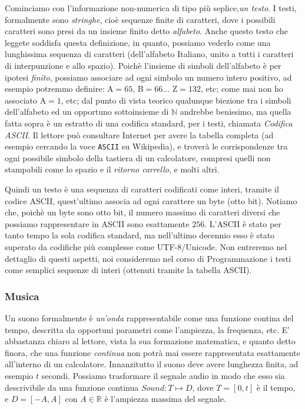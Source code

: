  Cominciamo con l'informazione non-numerica di tipo più seplice,\emph{un testo}. I testi, formalmente sono \emph{stringhe}, cioè sequenze finite di caratteri, dove i possibili caratteri sono presi da un insieme finito detto \emph{alfabeto}. Anche questo testo che leggete soddisfa questa definizione,
 in quanto, possiamo vederlo come una lunghissima sequenza di caratteri (dell'alfabeto Italiano, unito a tutti i caratteri di interpunzione e allo spazio). Poichè l'insieme di simboli dell'alfabeto è per ipotesi \emph{finito},
 possiamo associare ad ogni simbolo un numero intero positivo, ad esempio potremmo definire: \textsf{A}$=65$, \textsf{B}$=66 \ldots$ \textsf{Z}$=132$, etc; come mai non ho associato \textsf{A}$=1$, etc; dal punto di vista teorico
qualunque biezione tra i simboli dell'alfabeto ed un opportuno sottoinsieme di $\mathbb{N}$ andrebbe benissimo, ma quella fatta sopra è un estratto di una codifica standard, per i testi, chiamata \emph{Codifica ASCII}. Il lettore può consultare Internet per avere la tabella completa (ad esempio cercando la voce \texttt{ASCII} su Wikipedia), e troverà le corrispondenze tra ogni possibile simbolo della tastiera di un calcolatore, compresi quelli non stampabili come lo spazio e il \emph{ritorno carrello}, e molti altri.

Quindi un testo è una sequenza di caratteri codificati come interi, tramite il codice ASCII, quest'ultimo associa ad ogni carattere un byte (otto bit). Notiamo che, poichè un byte sono otto bit, il numero massimo di caratteri diversi che possiamo rappresentare in ASCII sono esattamente $256$. L'ASCII è stato per tanto tempo la sola codifica standard, ma nell'ultimo decennio esso è stato superato da codifiche più complesse come UTF-8/Unicode. Non entreremo nel dettaglio di questi aspetti, noi consideremo nel corso di Programmazione  i testi come semplici sequenze di interi (ottenuti tramite la tabella ASCII).

\subsubsection{Musica}

Un suono formalmente è \emph{un'onda} rappresentabile come una
funzione contina del tempo, descritta da opportuni parametri come l'ampiezza, la
frequenza, etc. E' abbastanza chiaro al lettore, vista la sua formazione matematica, e quanto detto finora, che una funzione \emph{continua} non potrà mai essere rappresentata esattamente all'interno di un calcolatore. Innanzitutto il suono deve avere lunghezza
finita, ad esempio $t$ secondi. Possiamo trasformare il segnale audio in modo che esso sia descrivibile da una funzione continua $Sound: T \mapsto D$, dove $T
= [0,t]$ è il tempo, e $D = [-A,A]$ con $A \in \mathbb{R}$ è l'ampiezza massima
del segnale.

